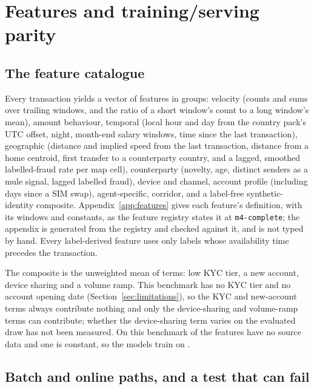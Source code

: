 \section{Features and training/serving parity}
\label{sec:features}

\subsection{The feature catalogue}

Every transaction yields a vector of \nFeatures{} features in \nFeatureGroups{} groups: velocity
(counts and sums over trailing windows, and the ratio of a short window's count to a long window's
mean), amount behaviour, temporal (local hour and day from the country pack's UTC offset, night,
month-end salary windows, time since the last transaction), geographic (distance and implied speed
from the last transaction, distance from a home centroid, first transfer to a
counterparty country, and a
lagged, smoothed labelled-fraud rate per map cell), counterparty (novelty, age, distinct senders as
a mule signal, lagged labelled fraud), device and channel, account profile (including days since a
SIM swap), agent-specific, corridor, and a label-free synthetic-identity composite. Appendix~\ref{app:features}
gives each feature's definition, with its windows and constants, as the feature registry states it
at \texttt{m4-complete}; the appendix is generated from the registry and checked against it, and is
not typed by hand. Every label-derived feature uses only labels whose availability time precedes the
transaction.

The composite is the unweighted mean of \nSynthTerms{} terms: low KYC tier, a new account, device
sharing and a volume ramp. This benchmark has no KYC tier and no account opening date
(Section~\ref{sec:limitations}), so the KYC and new-account terms always contribute nothing and only the
device-sharing and volume-ramp terms can contribute; whether the device-sharing term varies on the
evaluated draw has not been measured. On this benchmark \nNoSourceFeatures{} of the features have no
source data and one is constant, so the models train on \nTrainableFeatures{}.

\subsection{Batch and online paths, and a test that can fail}


